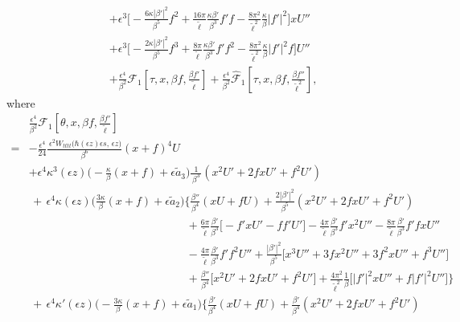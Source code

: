 \documentclass[10pt, reqno]{amsart}
\numberwithin{equation}{section}
\theoremstyle{definition}
\begin{document}
{{\begin{align*}
 & +\epsilon^3\Big[ -\frac{6\kappa|\beta'|^2}{\beta^5}f^2
 + \frac{16\pi}{ {\tilde\ell}} \frac{\kappa\beta'}{\beta^3} f' f
-\frac{8\pi^2} {{\tilde\ell}^2}\frac{\kappa}{\beta} |f'|^2\Big] x U''
\nonumber\\[2mm]
 & +\epsilon^3\Big[ -\frac{2\kappa|\beta'|^2}{\beta^5}f^3
 +\frac{8\pi}{ {\tilde\ell}} \frac{\kappa\beta'}{\beta^3} f' f^2
 -\frac{8\pi^2} {{\tilde\ell}^2}\frac{\kappa}{\beta} |f'|^2 f \Big] U''
\nonumber\\[2mm]
 & + \frac{\epsilon^4}{\beta^2} \mathcal F_1\left[\tau, x, \beta f, \frac{\beta f'}{\tilde\ell}\right]
 + \frac{\epsilon^4}{\beta^2} \hat{\mathcal F}_1\left[\tau, x, \beta f, \frac{\beta f''}{\tilde\ell^2} \right],
\end{align*}
 where
\begin{align} \label{mathcal F1}
 &\frac{\epsilon^4}{\beta^2} \mathcal F_1\left[\theta, x, \beta f, \frac{\beta f'}{\tilde\ell} \right]
 \nonumber\\[2mm]
 =&-\frac{\epsilon^4}{24} \frac{\,\epsilon^2 W_{tttt}\big(\hbar(\epsilon z)\epsilon s, \, \epsilon z\big)}{\beta^6} (x+f)^4U
\nonumber\\[2mm]
 &+
\epsilon^4 \kappa^3(\epsilon z) \Big( -\frac{\kappa}{\beta}(x+f) + \epsilon {\tilde a}_3 \Big)
\frac{1}{\, \beta^3\, }(x^2U'+2fxU'+f^2U')
\nonumber\\[2mm]
&\,+\,
\epsilon^4 \kappa(\epsilon z) \Big( \frac{3\kappa}{\beta}(x+f) + \epsilon {\tilde a}_2 \Big)
\Bigg\{
\frac{\beta''} {\beta^4} (xU+fU)
+\frac{2|\beta'|^2}{\beta^5} (x^2U'+2fxU'+f^2U')
\nonumber\\[2mm]
&\qquad\qquad\qquad\qquad\qquad\qquad\qquad
+\frac{6\pi}{{\tilde\ell}}\frac{\beta'} {\beta^3} \big[- f' xU' - ff' U' \big]
- \frac{4\pi}{{\tilde\ell}} \frac{\beta'} {\beta^3} f' x^2U''
-\frac{ 8\pi}{ {\tilde\ell}}\frac{\beta'} {\beta^3} f' fxU''
\nonumber\\[2mm]
&\qquad\qquad\qquad\qquad\qquad\qquad\qquad
-\frac{4\pi}{{\tilde\ell}} \frac{\beta'} {\beta^3} f' f^2U''
+ \frac{|\beta'|^2}{\beta^5} \big[x^3U''+3fx^2U''+3f^2xU''+f^3U''\big]
\nonumber\\[2mm]
&\qquad\qquad\qquad\qquad\qquad\qquad\qquad
+ \frac{\beta''}{\beta^4} \big[x^2U'+2fxU'+f^2U'\big]
+\frac{4\pi^2}{{\tilde\ell}^2}\frac{1}{\beta} \big[ |f'|^2 xU'' + f|f'|^2 U'' \big]
\Bigg\}
\nonumber\\[2mm]
& \,+\,
\epsilon^4 \kappa'(\epsilon z)\Big(- \frac{3\kappa}{\beta}(x+f) + \epsilon {\tilde a}_1\Big)
\Bigg\{
\frac{\beta'}{\beta^4} (xU+fU)
+\frac{\beta'}{\beta^4} (x^2U'+2fxU'+f^2U')

\end{align}}}
\end{document}
